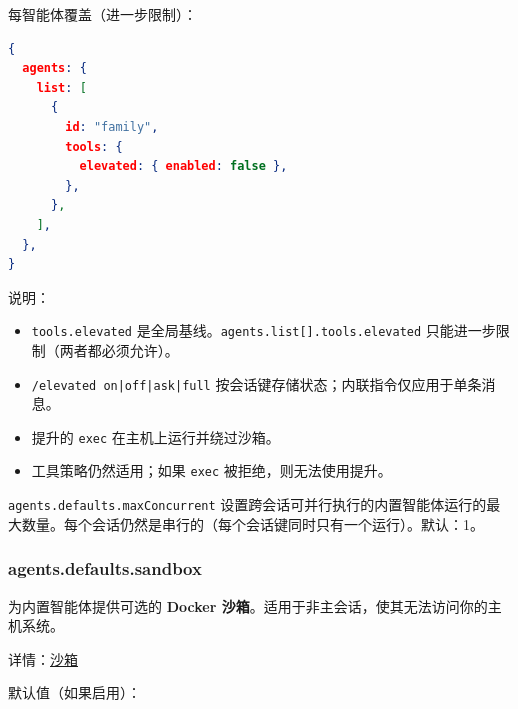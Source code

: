 每智能体覆盖（进一步限制）：

\begin{lstlisting}[language=json]
{
  agents: {
    list: [
      {
        id: "family",
        tools: {
          elevated: { enabled: false },
        },
      },
    ],
  },
}
\end{lstlisting}


说明：

\begin{itemize}
  \item \texttt{tools.elevated} 是全局基线。\texttt{agents.list[].tools.elevated} 只能进一步限制（两者都必须允许）。
  \item \texttt{/elevated on|off|ask|full} 按会话键存储状态；内联指令仅应用于单条消息。
  \item 提升的 \texttt{exec} 在主机上运行并绕过沙箱。
  \item 工具策略仍然适用；如果 \texttt{exec} 被拒绝，则无法使用提升。
\end{itemize}


\texttt{agents.defaults.maxConcurrent} 设置跨会话可并行执行的内置智能体运行的最大数量。每个会话仍然是串行的（每个会话键同时只有一个运行）。默认：1。

\subsubsection{agents.defaults.sandbox}


为内置智能体提供可选的 \textbf{Docker 沙箱}。适用于非主会话，使其无法访问你的主机系统。

详情：\href{/gateway/sandboxing}{沙箱}

默认值（如果启用）：

